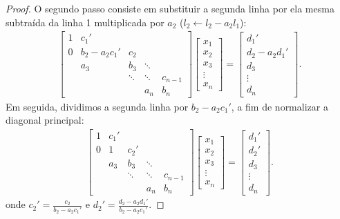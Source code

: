 \begin{proof}
O segundo passo consiste em substituir a segunda linha por ela mesma subtraída da linha 1 multiplicada por $a_2$ ($l_2\leftarrow l_2-a_2l_1$):
\begin{eqnarray*} \begin{bmatrix}
   {1} & {c_1'} & {   } & {   } & {   } \\
   {0} & {b_2-a_2c_1'} & {c_2} & {   } & {   } \\
   {   } & {a_3} & {b_3} & \ddots & {   } \\
   {   } & {   } & \ddots & \ddots & {c_{n-1}}\\
   {   } & {   } & {   } & {a_n} & {b_n}
\end{bmatrix}
\begin{bmatrix}
   {x_1 }  \\
   {x_2 }  \\
   {x_3 }  \\
   \vdots   \\
   {x_n }
\end{bmatrix}
=
\begin{bmatrix}
   {d_1' }  \\
   {d_2 -a_2d_1' }  \\
   {d_3 }  \\
   \vdots   \\
   {d_n }
\end{bmatrix}.
\end{eqnarray*}
Em seguida, dividimos a segunda linha por $b_2-a_2c_1'$, a fim de normalizar a diagonal principal:
\begin{eqnarray*} \begin{bmatrix}
   {1} & {c_1'} & {   } & {   } & {   } \\
   {0} & {1} & {c_2'} & {   } & {   } \\
   {   } & {a_3} & {b_3} & \ddots & {   } \\
   {   } & {   } & \ddots & \ddots & {c_{n-1}}\\
   {   } & {   } & {   } & {a_n} & {b_n}
\end{bmatrix}
\begin{bmatrix}
   {x_1 }  \\
   {x_2 }  \\
   {x_3 }  \\
   \vdots   \\
   {x_n }
\end{bmatrix}
=
\begin{bmatrix}
   {d_1' }  \\
   {d_2' }  \\
   {d_3 }  \\
   \vdots   \\
   {d_n }
\end{bmatrix}.
\end{eqnarray*}
onde $c_2'=\frac{c_2}{b_2-a_2c_1'}$ e $d_2'=\frac{d_2 -a_2d_1'}{b_2-a_2c_1'}$.


\end{proof}
